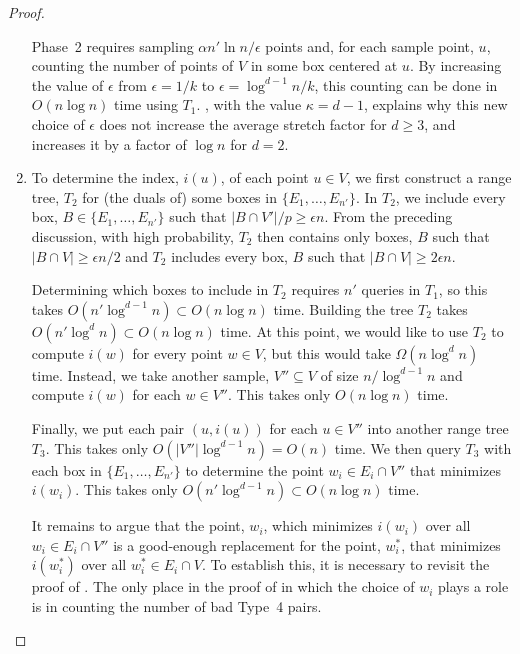 \documentclass{patmorin}
\begin{document}
\begin{proof}
\begin{enumerate}
     Phase~2 requires sampling $\alpha n'\ln n/\epsilon$ points and,
     for each sample point, $u$, counting the number of points of $V$
     in some box centered at $u$.  By increasing the value of $\epsilon$
     from $\epsilon=1/k$ to $\epsilon=\log^{d-1} n/k$, this counting can
     be done in $O(n\log n)$ time using $T_1$.  ,
     with the value $\kappa=d-1$, explains why this new choice of
     $\epsilon$ does not increase the average stretch factor for $d\ge
     3$, and increases it by a factor of $\log n$ for $d=2$.

    \item To determine the index, $i(u)$, of each point $u\in V$, we
      first construct a range tree, $T_2$ for (the duals of) some boxes
      in  $\{E_1,\ldots,E_{n'}\}$.  In $T_2$, we include every box,
      $B\in\{E_1,\ldots,E_{n'}\}$ such that $|B\cap V'|/p\ge\epsilon n$.
      From the preceding discussion, with high probability, $T_2$ then
      contains only boxes, $B$ such that $|B\cap V|\ge \epsilon n/2$ and
      $T_2$ includes every box, $B$ such that $|B\cap V|\ge 2\epsilon n$.

      Determining which boxes to include in $T_2$ requires $n'$ queries
      in $T_1$, so this takes $O(n'\log^{d-1} n)\subset O(n\log n)$ time.
      Building the tree $T_2$ takes $O(n'\log^{d} n)\subset O(n\log n)$
      time.  At this point, we would like to use $T_2$ to compute $i(w)$
      for every point $w\in V$, but this would take $\Omega(n\log^d
      n)$ time.  Instead, we take another sample, $V''\subseteq V$
      of size $n/\log^{d-1} n$ and compute $i(w)$ for each $w\in V''$.
      This takes only $O(n\log n)$ time.

      Finally, we put each pair $(u,i(u))$ for each $u\in V''$ into
      another range tree $T_3$.  This takes only $O(|V''|\log^{d-1}
      n)=O(n)$ time.  We then query $T_3$ with each box in
      $\{E_1,\ldots,E_{n'}\}$ to determine the point $w_i\in E_i\cap V''$
      that minimizes $i(w_i)$.  This takes only $O(n'\log^{d-1}n)\subset
      O(n\log n)$ time.

      It remains to argue that the point, $w_i$, which minimizes $i(w_i)$
      over all $w_i\in E_{i}\cap V''$ is a good-enough replacement for
      the point, $w_i^*$, that minimizes $i(w_i^*)$ over all $w_i^*\in
      E_i\cap V$.  To establish this, it is necessary to revisit the
      proof of .  The only place in the proof of
       in which the choice of $w_i$ plays a role is
      in counting the number of bad Type~4 pairs.


\end{enumerate}
\end{proof}
\end{document}
